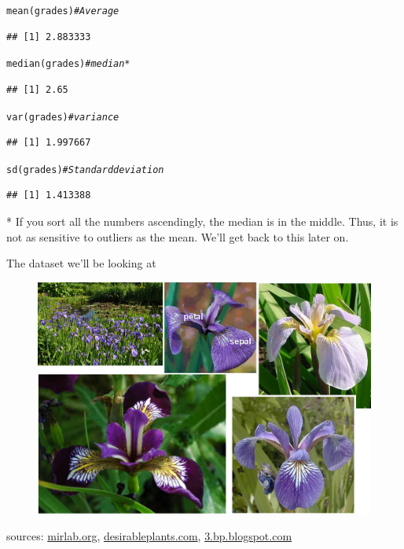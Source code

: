 \documentclass[xcolor=table,       handout,    xcolor=dvipsnames]{beamer}\usepackage[]{graphicx}\usepackage[]{color}
\makeatletter
\newcommand{\hlcom}[1]{\textcolor[rgb]{0,0.392,0}{\textit{#1}}}
\newcommand{\hlstd}[1]{\textcolor[rgb]{0,0,0}{#1}}
\newcommand{\hlkwd}[1]{\textcolor[rgb]{0,0,1}{#1}}
\newenvironment{kframe}{%
 \def\at@end@of@kframe{}%
 \ifinner\ifhmode%
  \def\at@end@of@kframe{\end{minipage}}%
  \begin{minipage}{\columnwidth}%
 \fi\fi%
 \def\FrameCommand##1{\hskip\@totalleftmargin \hskip-\fboxsep
 \colorbox{shadecolor}{##1}\hskip-\fboxsep
     \hskip-\linewidth \hskip-\@totalleftmargin \hskip\columnwidth}%
 \MakeFramed {\advance\hsize-\width
   \@totalleftmargin\z@ \linewidth\hsize
   \@setminipage}}%
 {\par\unskip\endMakeFramed%
 \at@end@of@kframe}
\newenvironment{knitrout}{}{} %
\makeatother
\begin{document}
\begin{frame}[fragile]
\begin{knitrout}
\color{fgcolor}\begin{kframe}
\begin{alltt}
\hlkwd{mean}\hlstd{(grades)}   \hlcom{# Average}
\end{alltt}
\begin{verbatim}
## [1] 2.883333
\end{verbatim}
\begin{alltt}
\hlkwd{median}\hlstd{(grades)} \hlcom{# median*}
\end{alltt}
\begin{verbatim}
## [1] 2.65
\end{verbatim}
\begin{alltt}
\hlkwd{var}\hlstd{(grades)}    \hlcom{# variance}
\end{alltt}
\begin{verbatim}
## [1] 1.997667
\end{verbatim}
\begin{alltt}
\hlkwd{sd}\hlstd{(grades)}     \hlcom{# Standard deviation}
\end{alltt}
\begin{verbatim}
## [1] 1.413388
\end{verbatim}
\end{kframe}
\end{knitrout}
* If you sort all the numbers ascendingly, the median is in the middle. Thus, it is not as sensitive to outliers as the mean. We'll get back to this later on.
\end{frame}


\begin{frame}{The dataset we'll be looking at}
  \begin{figure}[h]
    \begin{center}
  	\includegraphics[width=.8\linewidth]{./externalfig/IrisComposition.png}
    \end{center}
  \end{figure}
	sources: \href{http://mirlab.org/jang/books/dcpr/dataSetIris.asp}{mirlab.org},
  \href{http://www.desirableplants.com/images/i/iris_versicolor_mysterious_monique.jpg}{desirableplants.com},
  \href{http://3.bp.blogspot.com/-0dZyClxOh8E/TrFc00J8AcI/AAAAAAAABrA/AJJl4HbMboU/s400/Iris\%2Bsetosa\%2B8.JPG}{3.bp.blogspot.com}
\end{frame}
\end{document}
